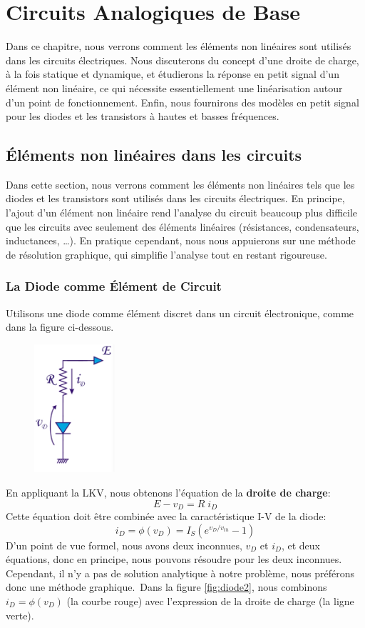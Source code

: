 \chapter{Circuits Analogiques de Base}
Dans ce chapitre, nous verrons comment les éléments non linéaires sont utilisés dans les circuits électriques. Nous discuterons du concept d'une droite de charge, à la fois statique et dynamique, et étudierons la réponse en petit signal d'un élément non linéaire, ce qui nécessite essentiellement une linéarisation autour d'un point de fonctionnement. Enfin, nous fournirons des modèles en petit signal pour les diodes et les transistors à hautes et basses fréquences.

\section{Éléments non linéaires dans les circuits}
\label{sec:nonlin_circuits}
Dans cette section, nous verrons comment les éléments non linéaires tels que les diodes et les transistors sont utilisés dans les circuits électriques. En principe, l'ajout d'un élément non linéaire rend l'analyse du circuit beaucoup plus difficile que les circuits avec seulement des éléments linéaires (résistances, condensateurs, inductances, \ldots). En pratique cependant, nous nous appuierons sur une méthode de résolution graphique, qui simplifie l'analyse tout en restant rigoureuse.
\subsection{La Diode comme Élément de Circuit}
Utilisons une diode comme élément discret dans un circuit électronique, comme dans la figure ci-dessous.

\begin{figure}
	\centering
	\includegraphics[width=3cm]{figures/ch02/diode1.jpg}
	\caption{}
	\label{fig:diode1}
\end{figure}
En appliquant la LKV, nous obtenons l'équation de la \textbf{droite de charge}:
$$
E - v_D = R \; i_D
$$
Cette équation doit être combinée avec la caractéristique I-V de la diode:
$$
i_D = \phi(v_D) = I_S (e^{v_D/v_{th}} - 1)
$$
D'un point de vue formel, nous avons deux inconnues, $v_D$ et $i_D$, et deux équations, donc en principe, nous pouvons résoudre pour les deux inconnues. Cependant, il n'y a pas de solution analytique à notre problème, nous préférons donc une méthode graphique.\
Dans la figure \ref{fig:diode2}, nous combinons $i_D = \phi(v_D)$ (la courbe rouge) avec l'expression de la droite de charge (la ligne verte).


